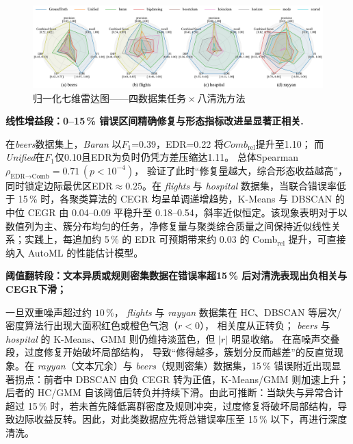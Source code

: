 \documentclass[10pt]{article} %
\numberwithin{equation}{section}
\begin{document}
\begin{figure}[t]
  \centering
  \includegraphics[width=\linewidth]{figures/6.4.3graph/radar_four_in_one.pdf}
  \caption{归一化七维雷达图——四数据集任务 × 八清洗方法}
  \label{fig:radar_four_in_one}
\end{figure}

\medskip
\noindent%
\textbf{线性增益段：0–15\,\% 错误区间精确修复与形态指标改进呈显著正相关.}\;

在\textit{beers}数据集上，\textit{Baran} 以\(F_1\)=0.39，EDR=0.22 将\(Comb_\text{rel}\)提升至1.10；
而\textit{Unified}在\(F_1\)仅0.10且EDR为负时仍凭方差压缩达1.11。
总体Spearman \(\rho_{\text{EDR}\rightarrow\text{Comb}}=0.71\,(p<10^{-4})\)，
验证了此时“修复量越大，综合形态收益越高”，同时锁定边际最优区EDR\(\approx0.25\)。在 \textit{flights} 与 \textit{hospital} 数据集，当联合错误率低于 15\,\% 时，各聚类算法的 CEGR 均呈单调递增趋势，K-Means 与 DBSCAN 的中位 CEGR 由 0.04–0.09 平稳升至 0.18–0.54，斜率近似恒定。\textcolor[rgb]{0.00,0.07,1.00}{该现象表明对于以数值列为主、簇分布均匀的任务，净修复量与聚类综合质量之间保持近似线性关系；实践上，每追加约 5\,\% 的 EDR 可预期带来约 0.03 的 Comb\(_{\text{rel}}\) 提升，可直接纳入 AutoML 的性能估计模型。}

\medskip
\noindent%
\textbf{阈值翻转段：文本异质或规则密集数据在错误率超15\,\% 后对清洗表现出负相关与CEGR下滑；}\;
  
一旦双重噪声超过约 $10\,\%$，
\textit{flights} 与 \textit{rayyan} 数据集在 HC、DBSCAN 等层次/密度算法行出现大面积红色或橙色气泡（$r<0$），
相关度从正转负；
\textit{beers} 与 \textit{hospital} 的 K-Means、GMM 则仍维持淡蓝色，但 $|r|$ 明显收缩。
在高噪声交叠段，过度修复开始破坏局部结构，
导致“修得越多，簇划分反而越差”的反直觉现象。在 \textit{rayyan}（文本冗余）与 \textit{beers}（规则密集）数据集，15\,\% 错误附近出现显著拐点：前者中 DBSCAN 由负 CEGR 转为正值，K-Means/GMM 则加速上升；后者的 HC/GMM 自该阈值后转负并持续下滑。由此可推断：\textcolor[rgb]{0.00,0.07,1.00}{当缺失与异常合计超过 15\,\% 时，若未首先降低离群密度及规则冲突，过度修复将破坏局部结构，导致边际收益反转。因此，对此类数据应先将总错误率压至 15\,\% 以下，再进行深度清洗。}
\end{document}
